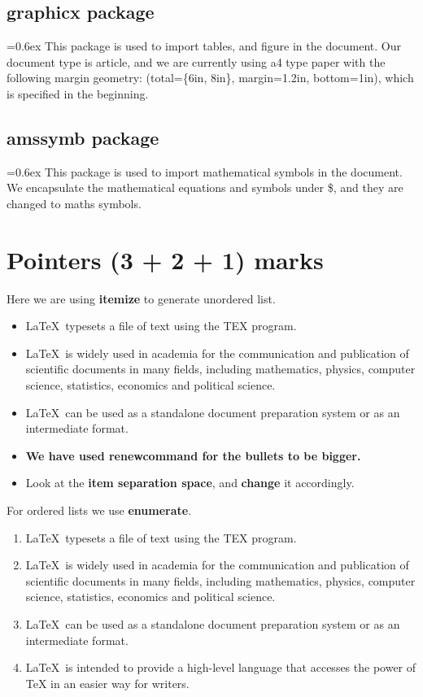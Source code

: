 \documentclass[12pt]{article}
\newcommand{\latex}{\LaTeX\ }
\renewcommand{\baselinestretch}{1}  %
\begin{document}
\subsection{graphicx package}
\renewcommand{\baselinestretch}{.8}
\font=0.6ex
\noindent
This package is used to import tables, and figure in the document. Our
document type is article, and we are currently using a4 type paper with the
following margin geometry: (total=\{6in, 8in\}, margin=1.2in, bottom=1in),
which is specified in the beginning.
\subsection{amssymb package}
\renewcommand{\baselinestretch}{.8}
\font=0.6ex
\noindent
This package is used to import mathematical symbols in the document. We
encapsulate the mathematical equations and symbols under \$, and they are
changed to maths symbols.
\section{Pointers (3 + 2 + 1) marks}
Here we are using \textbf{itemize} to generate unordered list.

\begin{itemize}%
\setlength{\itemsep}{2em}
\renewcommand{\labelitemi}{\large$\bullet$}
\item \latex typesets a file of text using the TEX program.
\item \latex is widely used in academia for the communication and publication
of scientific documents in many fields, including mathematics, physics,
computer science, statistics, economics and political science.
\item \latex can be used as a standalone document preparation system or as an
intermediate format.
\item \textbf{We have used renewcommand for the bullets to be bigger.}
\item Look at the \textbf{item separation space}, and \textbf{change} it accordingly.
\end{itemize}

For ordered lists we use \textbf{enumerate}.
\renewcommand{\labelenumi}{\Roman{enumi}}
\begin{enumerate}
\item \latex typesets a file of text using the TEX program.
\item \latex is widely used in academia for the communication and publication
of scientific documents in many fields, including mathematics, physics,
computer science, statistics, economics and political science.
\item \latex can be used as a standalone document preparation system or as an intermediate format.
\item \latex is intended to provide a high-level language that accesses the power of TeX in an easier way for writers.
\end{enumerate}
\end{document}
